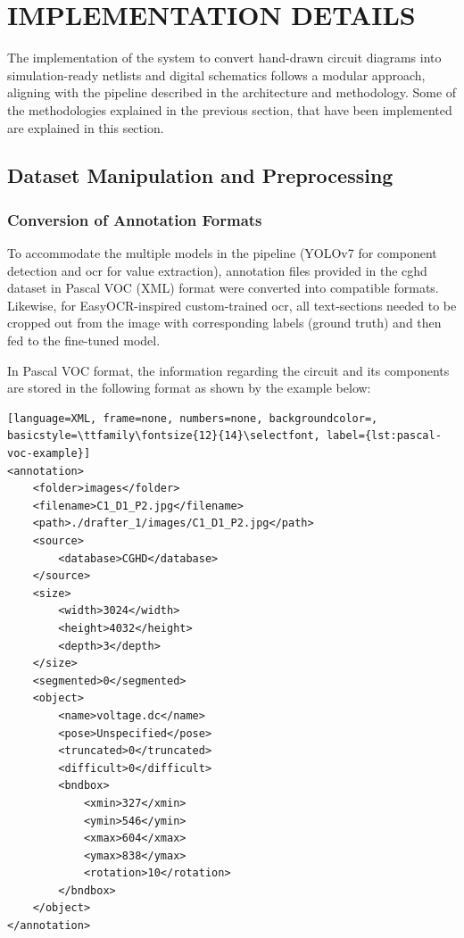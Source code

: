 \chapter{IMPLEMENTATION DETAILS}

The implementation of the system to convert hand-drawn circuit diagrams into simulation-ready netlists and digital schematics follows a modular approach, aligning with the pipeline described in the architecture and methodology. Some of the methodologies explained in the previous section, that have been implemented are explained in this section.

\section{Dataset Manipulation and Preprocessing}

\subsection{Conversion of Annotation Formats}

To accommodate the multiple models in the pipeline (YOLOv7 for component detection and \gls{ocr} for value extraction), annotation files provided in the \gls{cghd} dataset in Pascal VOC (XML) format were converted into compatible formats. Likewise, for EasyOCR-inspired custom-trained \gls{ocr}, all text-sections needed to be cropped out from the image with corresponding labels (ground truth) and then fed to the fine-tuned model.

In Pascal VOC format, the information regarding the circuit and its components are stored in the following format as shown by the example below:

\begin{lstlisting}[language=XML, frame=none, numbers=none, backgroundcolor=, basicstyle=\ttfamily\fontsize{12}{14}\selectfont, label={lst:pascal-voc-example}]
<annotation>
    <folder>images</folder>
    <filename>C1_D1_P2.jpg</filename>
    <path>./drafter_1/images/C1_D1_P2.jpg</path>
    <source>
        <database>CGHD</database>
    </source>
    <size>
        <width>3024</width>
        <height>4032</height>
        <depth>3</depth>
    </size>
    <segmented>0</segmented>
    <object>
        <name>voltage.dc</name>
        <pose>Unspecified</pose>
        <truncated>0</truncated>
        <difficult>0</difficult>
        <bndbox>
            <xmin>327</xmin>
            <ymin>546</ymin>
            <xmax>604</xmax>
            <ymax>838</ymax>
            <rotation>10</rotation>
        </bndbox>
    </object>
</annotation>
\end{lstlisting}

